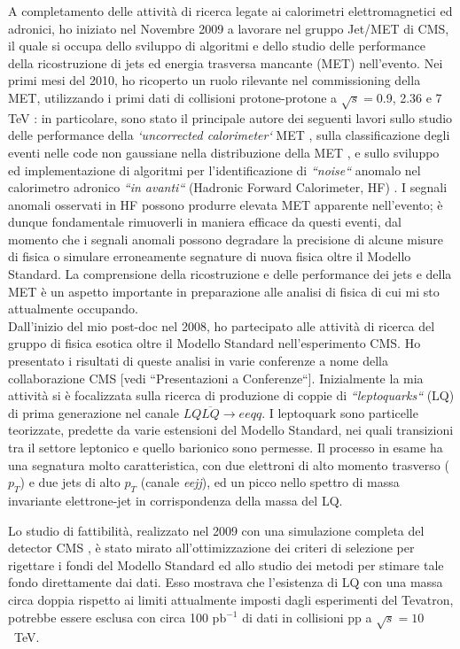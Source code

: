 \documentclass[10pt, a4paper]{article}
\begin{document}
A completamento delle attivit\`a di ricerca legate ai calorimetri elettromagnetici ed adronici, ho iniziato nel Novembre 2009 a 
lavorare nel gruppo Jet/MET di CMS, il quale si occupa dello sviluppo di algoritmi e dello studio delle performance della ricostruzione 
di jets ed energia trasversa mancante (MET) nell'evento. Nei primi mesi del 2010, ho ricoperto un ruolo rilevante nel commissioning 
della MET, utilizzando i primi dati di collisioni protone-protone a $\sqrt{s}=$0.9, 2.36 e 7 TeV \cite{JME-10-004,JME-10-002}: 
in particolare, sono stato il principale autore dei seguenti lavori sullo studio delle performance della {\it `uncorrected calorimeter`} 
MET \cite{AN-2010-029},  sulla classificazione degli eventi nelle code non gaussiane nella distribuzione della MET \cite{AN-2010-219}, 
e sullo sviluppo ed implementazione di algoritmi per l'identificazione di {\it ``noise``} anomalo nel calorimetro 
adronico {\it ``in avanti``} (Hadronic Forward Calorimeter, HF) \cite{DN-2010-008}. I segnali anomali 
osservati in HF possono produrre elevata MET apparente nell'evento; \`e dunque fondamentale 
rimuoverli in maniera efficace da questi eventi, dal momento che i segnali anomali possono 
degradare la precisione di alcune misure di fisica o simulare erroneamente segnature di nuova fisica oltre il Modello Standard. 
La comprensione della ricostruzione e delle performance dei jets e della MET \`e un aspetto importante 
in preparazione alle analisi di fisica di cui mi sto attualmente occupando. \\

Dall'inizio del mio post-doc nel 2008, ho partecipato alle attivit\`a di ricerca del gruppo di fisica esotica oltre il 
Modello Standard nell'esperimento CMS. Ho presentato i risultati di queste analisi in varie conferenze  
a nome della collaborazione CMS [vedi ``Presentazioni a Conferenze``]. Inizialmente la mia attivit\`a si \`e focalizzata sulla ricerca 
di produzione di coppie di {\it ``leptoquarks``} (LQ) di prima generazione nel canale $LQ\overline{LQ} \rightarrow ee qq$. 
I leptoquark sono particelle teorizzate, predette da varie estensioni del Modello Standard, nei quali transizioni tra il settore leptonico 
e quello barionico sono permesse. Il processo in esame ha una segnatura molto caratteristica, con due elettroni di alto momento 
trasverso ($p_T$) e due jets di alto $p_T$ (canale {\it eejj}), ed un picco nello spettro di massa invariante elettrone-jet in corrispondenza 
della massa del LQ. 

Lo studio di fattibilit\`a, realizzato nel 2009 con una simulazione completa del detector CMS \cite{AN-2008-070,EXO-08-010}, 
\`e stato mirato all'ottimizzazione dei criteri di selezione per rigettare i fondi del Modello Standard ed allo studio dei metodi per stimare tale 
fondo direttamente dai dati. Esso mostrava che l'esistenza di LQ con una massa circa doppia rispetto ai limiti attualmente imposti dagli esperimenti 
del Tevatron, potrebbe essere esclusa con circa 100 pb$^{-1}$ di dati in collisioni pp a $\sqrt{s}=10$~TeV. 
\end{document}

